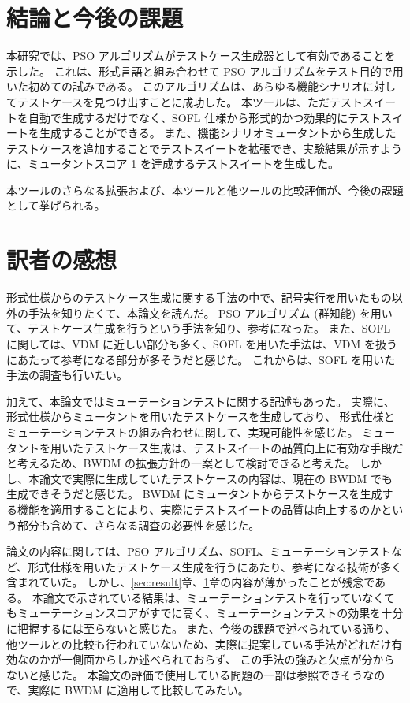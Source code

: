\documentclass[uplatex, twocolumn, 10pt]{jsarticle} %
\begin{document}
\section{結論と今後の課題}
\label{sec:conclusion_and_future_work}
本研究では、PSO アルゴリズムがテストケース生成器として有効であることを示した。
これは、形式言語と組み合わせて PSO アルゴリズムをテスト目的で用いた初めての試みである。
このアルゴリズムは、あらゆる機能シナリオに対してテストケースを見つけ出すことに成功した。
本ツールは、ただテストスイートを自動で生成するだけでなく、SOFL 仕様から形式的かつ効果的にテストスイートを生成することができる。
また、機能シナリオミュータントから生成したテストケースを追加することでテストスイートを拡張でき、実験結果が示すように、ミュータントスコア 1 を達成するテストスイートを生成した。

本ツールのさらなる拡張および、本ツールと他ツールの比較評価が、今後の課題として挙げられる。

\section*{訳者の感想}
形式仕様からのテストケース生成に関する手法の中で、記号実行を用いたもの以外の手法を知りたくて、本論文を読んだ。
PSO アルゴリズム (群知能) を用いて、テストケース生成を行うという手法を知り、参考になった。
また、SOFL に関しては、VDM に近しい部分も多く、SOFL を用いた手法は、VDM を扱うにあたって参考になる部分が多そうだと感じた。
これからは、SOFL を用いた手法の調査も行いたい。

加えて、本論文ではミューテーションテストに関する記述もあった。
実際に、形式仕様からミュータントを用いたテストケースを生成しており、
形式仕様とミューテーションテストの組み合わせに関して、実現可能性を感じた。
ミュータントを用いたテストケース生成は、テストスイートの品質向上に有効な手段だと考えるため、BWDM の拡張方針の一案として検討できると考えた。
しかし、本論文で実際に生成していたテストケースの内容は、現在の BWDM でも生成できそうだと感じた。
BWDM にミュータントからテストケースを生成する機能を適用することにより、実際にテストスイートの品質は向上するのかという部分も含めて、さらなる調査の必要性を感じた。

論文の内容に関しては、PSO アルゴリズム、SOFL、ミューテーションテストなど、形式仕様を用いたテストケース生成を行うにあたり、参考になる技術が多く含まれていた。
しかし、\ref{sec:result}章、\ref{sec:conclusion_and_future_work}章の内容が薄かったことが残念である。
本論文で示されている結果は、ミューテーションテストを行っていなくてもミューテーションスコアがすでに高く、ミューテーションテストの効果を十分に把握するには至らないと感じた。
また、今後の課題で述べられている通り、他ツールとの比較も行われていないため、実際に提案している手法がどれだけ有効なのかが一側面からしか述べられておらず、
この手法の強みと欠点が分からないと感じた。
本論文の評価で使用している問題の一部は参照できそうなので、実際に BWDM に適用して比較してみたい。
\end{document}
